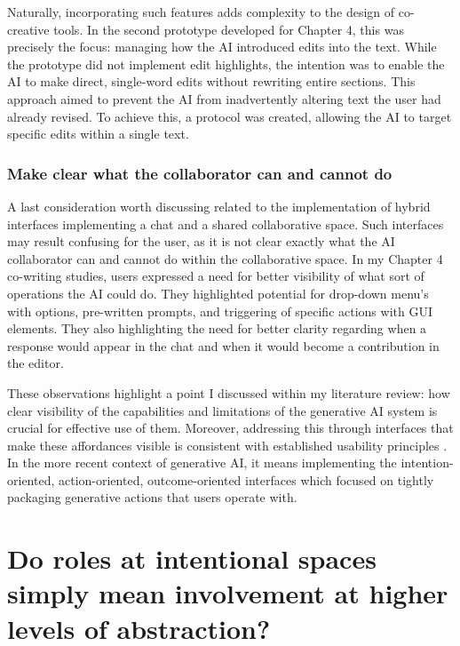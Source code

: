 Naturally, incorporating such features adds complexity to the design of co-creative tools. In the second prototype developed for Chapter 4, this was precisely the focus: managing how the AI introduced edits into the text. While the prototype did not implement edit highlights, the intention was to enable the AI to make direct, single-word edits without rewriting entire sections. This approach aimed to prevent the AI from inadvertently altering text the user had already revised. To achieve this, a protocol was created, allowing the AI to target specific edits within a single text.

\subsubsection{Make clear what the collaborator can and cannot do}

A last consideration worth discussing related to the implementation of hybrid interfaces implementing a chat and a shared collaborative space. Such interfaces may result confusing for the user, as it is not clear exactly what the AI collaborator can and cannot do within the collaborative space. In my Chapter 4 co-writing studies, users expressed a need for better visibility of what sort of operations the AI could do. They highlighted potential for drop-down menu's with options, pre-written prompts, and triggering of specific actions with GUI elements. They also highlighting the need for better clarity regarding when a response would appear in the chat and when it would become a contribution in the editor. 

These observations highlight a point I discussed within my literature review: how clear visibility of the capabilities and limitations of the generative AI system is crucial for effective use of them. Moreover, addressing this through interfaces that make these affordances visible is consistent with established usability principles \cite{Nielsen1994-df}. In the more recent context of generative AI, it means implementing the intention-oriented, action-oriented, outcome-oriented interfaces \cite{Weisz2024-io, Schaad2025-ca} which focused on tightly packaging generative actions that users operate with. 


\section{Do roles at intentional spaces simply mean involvement at higher levels of abstraction?}

